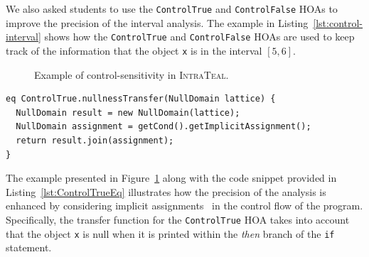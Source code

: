 We also asked students to use the \texttt{ControlTrue} and \texttt{ControlFalse}
HOAs to improve the precision of the interval analysis. The example in
Listing~\ref{lst:control-interval} shows how the \texttt{ControlTrue} and \texttt{ControlFalse}
HOAs are used to keep track of the information that the object \texttt{x} is in the interval $[5,6]$.
\begin{figure}
	\centering
	\caption{\label{fig:ExampleTEAL} Example of control-sensitivity in \textsc{IntraTeal}.}
\end{figure}
\begin{lstlisting}[language=JastAdd,label={lst:ControlTrueEq}, caption={Transfer function for \texttt{ControlTrue} HOA.}]
eq ControlTrue.nullnessTransfer(NullDomain lattice) {
  NullDomain result = new NullDomain(lattice);
  NullDomain assignment = getCond().getImplicitAssignment();
  return result.join(assignment);
}
\end{lstlisting}
The example presented in Figure~\ref{fig:ExampleTEAL} along with the code snippet
provided in Listing~\ref{lst:ControlTrueEq} illustrates how the precision of the
analysis is enhanced by considering implicit assignments~\cite{spa} in the control flow of
the program. Specifically, the transfer function for the \texttt{ControlTrue} HOA
takes into account that the object \texttt{x} is null when it is printed within
the \emph{then} branch of the \texttt{if} statement.



